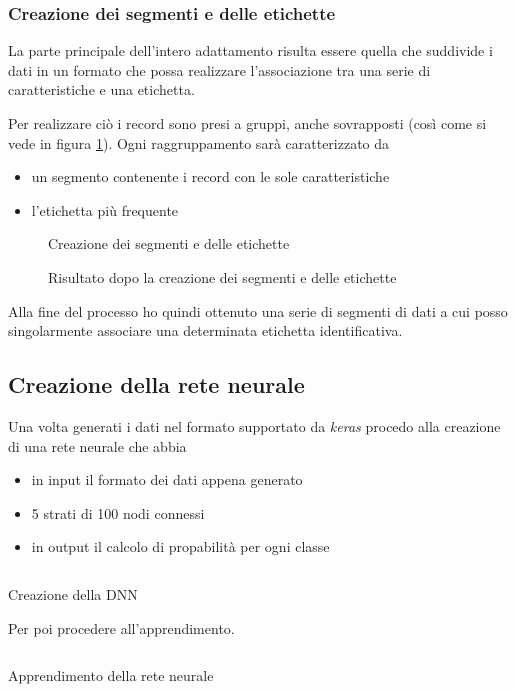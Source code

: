 \subsubsection{Creazione dei segmenti e delle etichette}
La parte principale dell'intero adattamento risulta essere quella che suddivide i dati in un formato che possa 
realizzare l'associazione tra una serie di caratteristiche e una etichetta.

Per realizzare ciò i record sono presi a gruppi, anche sovrapposti (così come si vede in figura \ref{fig:create_segments_and_labels}). 
Ogni raggruppamento sarà caratterizzato da 
\begin{itemize}
    \item un segmento contenente i record con le sole caratteristiche
    \item l'etichetta più frequente
\end{itemize}

\begin{figure}[H]
  \centering
  
  \caption{Creazione dei segmenti e delle etichette}
  \label{fig:create_segments_and_labels}
\end{figure}

\begin{figure}[H]
  \centering
  
  \caption{Risultato dopo la creazione dei segmenti e delle etichette}
  \label{fig:segments_and_labels}
\end{figure}

Alla fine del processo ho quindi ottenuto una serie di segmenti di dati a cui posso singolarmente associare una determinata
etichetta identificativa.


\subsection{Creazione della rete neurale}
Una volta generati i dati nel formato supportato da \textit{keras} procedo alla creazione di 
una rete neurale che abbia
\begin{itemize}
    \item in input il formato dei dati appena generato
    \item 5 strati di 100 nodi connessi
    \item in output il calcolo di propabilità per ogni classe
\end{itemize}
\begin{listing}[H] 
    \inputminted[frame=single,framesep=10pt]{python}{snippets/classifier/dnn_create.py}
    \caption{Creazione della DNN}
\end{listing}
Per poi procedere all'apprendimento.
\begin{listing}[H] 
    \inputminted[frame=single,framesep=10pt]{python}{snippets/classifier/dnn_fit.py}
    \caption{Apprendimento della rete neurale}
\end{listing}


